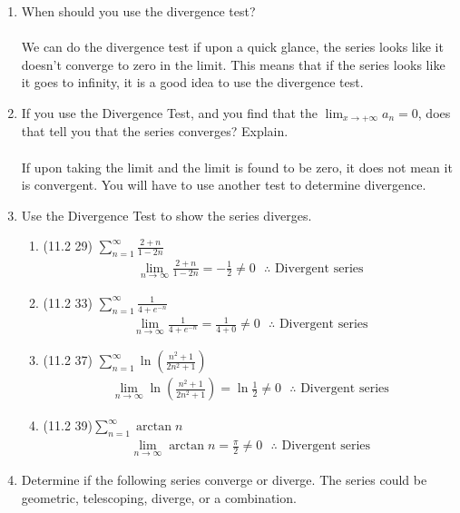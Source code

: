 \documentclass[12pt]{article}
\begin{document}
\begin{enumerate}
    \addtocounter{enumi}{9}\item When should you use the divergence test?\\\\
    We can do the divergence test if upon a quick glance, the series looks like it doesn't converge to zero in the limit. This means that if the series looks like it goes to infinity, it is a good idea to use the divergence test. 
    \item If you use the Divergence Test, and you find that the $\lim_{x\to+\infty}a_n=0$, does that tell you that the series converges? Explain.\\\\If upon taking the limit and the limit is found to be zero, it does not mean it is convergent. You will have to use another test to determine divergence.
    \item Use the Divergence Test to show the series diverges.
    \begin{enumerate}
        \item (11.2 29) $\sum^\infty_{n=1}\frac{2+n}{1-2n}$
        \begin{align*}
            \lim_{n\to\infty}\frac{2+n}{1-2n}=-\frac{1}{2}\neq  0 \text{ $\therefore$ Divergent series}
        \end{align*}
        \item (11.2 33) $\sum^\infty_{n=1}\frac{1}{4+e^{-n}}$
        \begin{align*}
            \lim_{n\to\infty}\frac{1}{4+e^{-n}}=\frac{1}{4+0} \neq  0 \text{ $\therefore$ Divergent series}
        \end{align*}
        \item (11.2 37) $\sum^\infty_{n=1}\ln{\left(\frac{n^2+1}{2n^2+1}\right)}$
        \begin{align*}
            \lim_{n\to\infty}\ln{\left(\frac{n^2+1}{2n^2+1}\right)}=\ln\frac{1}{2}\neq 0\text{ $\therefore$ Divergent series}
        \end{align*}
        \item (11.2 39)$\sum^\infty_{n=1}\arctan{n}$
        \begin{align*}
            \lim_{n\to\infty}\arctan n = \frac{\pi}{2}\neq 0\text{ $\therefore$ Divergent series}
        \end{align*}
    \end{enumerate}
    \newpage\item Determine if the following series converge or diverge. The series could be geometric, telescoping, diverge, or a combination.

\end{enumerate}
\end{document}
